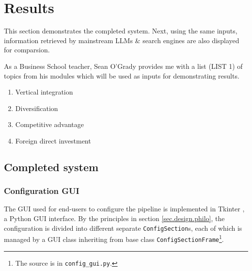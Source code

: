 \documentclass[final-report]{report-template}
\newcommand\ttb{\discretionary{}{}{}}
\begin{document}
\section{Results}
This section demonstrates the completed system.  Next, using the same inputs,
information retrieved by mainstream LLMs \& search engines are also displayed
for comparsion.

As a Business School teacher, Sean O'Grady provides me with a list (LIST 1) of
topics from his modules which will be used as inputs for demonstrating results.
\begin{enumerate}
	\item Vertical integration
	\item Diversification 
	\item Competitive advantage
	\item Foreign direct investment
\end{enumerate}

\subsection{Completed system}
\subsubsection{Configuration GUI}
The GUI used for end-users to configure the pipeline is implemented in Tkinter
\cite{tkinter}, a Python GUI interface. By the principles in section
\ref{sec.design.philo}, the configuration is divided into different separate
\texttt{Config\ttb Section}s, each of which is managed by a GUI class
inheriting from base class \texttt{Config\ttb Section\ttb Frame}\footnote{The
source is in \texttt{config\_\ttb gui.py}.}.
\end{document}
